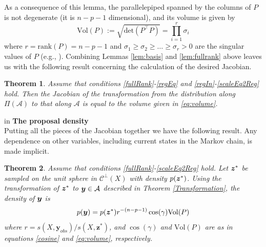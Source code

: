 \documentclass[ba]{imsart}
\newcommand{\by}{\mbox{\boldmath $y$}}
\newcommand{\bz}{\mbox{\boldmath $z$}}
\newcommand{\mc}{\mathcal}
\newtheorem{theorem}{Theorem}[section]
\begin{document}
As a consequence of this lemma, 
the parallelepiped spanned by the columns of $P$ is not
degenerate (it is $n-p-1$ dimensional), and its volume
is given by
\begin{equation}
\label{eq:volume}
\text{Vol} (P) := \sqrt{\text{det}(P^\top P)}=\prod_{i=1}^{r} \sigma_i
\end{equation}
where $r=\text{rank} (P)=n-p-1$ and $\sigma_1\geq
\sigma_2\geq\dots\geq\sigma_r>0$ are the singular values of $P$ (e.g.,
\cite{miao1992}). 
Combining Lemmas \ref{lem:basis} and \ref{lem:fullrank} above leaves us with the following result concerning the calculation of the desired Jacobian.  
\begin{theorem}
\label{Jacobian}
Assume that conditions \ref{fullRank}-\ref{regEq} and \ref{regIn}-\ref{scaleEq2Reg} hold.  Then the
Jacobian of the transformation from the distribution along 
$\Pi(\mc A)$ to that along $\mc A $ is equal to the volume given in \eqref{eq:volume}.
\end{theorem}

 in
\noindent
{\bf The proposal density} \\
Putting all the pieces of the Jacobian together we have the following result. Any dependence on other variables, including current states in the Markov chain, is made implicit. 
\begin{theorem} 
Assume that conditions \ref{fullRank}-\ref{scaleEq2Reg} hold.  Let $\bz^{*}$ be sampled on the unit sphere in $\mc {C}^\perp (X)$ with density $p(\bz^{*})$.  Using the transformation of $\bz^*$ to $\by\in \mc A$ described in Theorem \ref{Transformation}, the density of $\by$ is
\begin{equation}
\label{dens:ystst}
p(\by)=p(\bz^*) r^{-(n-p-1)} \cos(\gamma)\text{Vol} (P)
\end{equation}
where $r={s(X,\boldsymbol{y}_{obs})}/{s(X,  \boldsymbol{z}^{*})}$,
and $\cos(\gamma)$ and $\text{Vol} (P)$ are as in equations \eqref{cosine} and \eqref{eq:volume}, respectively. 
\end{theorem} 
\end{document}
